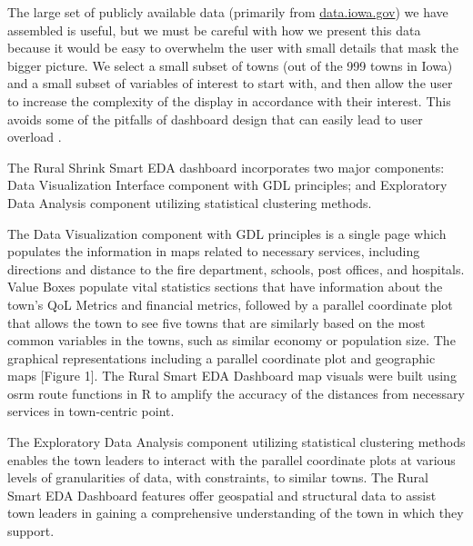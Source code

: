 \documentclass[10pt]{article}\usepackage[]{graphicx}\usepackage[]{color}
\begin{document}
The large set of publicly available data (primarily from \url{data.iowa.gov}) we have assembled is useful, but we must be careful with how we present this data because it would be easy to overwhelm the user with small details that mask the bigger picture. We select a small subset of towns (out of the 999 towns in Iowa) and a small subset of variables of interest to start with, and then allow the user to increase the complexity of the display in accordance with their interest. This avoids some of the pitfalls of dashboard design that can easily lead to user overload \cite{few}.


The Rural Shrink Smart EDA dashboard incorporates two major components: Data Visualization Interface component with GDL principles; and Exploratory Data Analysis component utilizing statistical clustering methods.

The Data Visualization component with GDL principles is a single page which populates the information in maps related to necessary services, including directions and distance to the fire department, schools, post offices, and hospitals. Value Boxes populate vital statistics sections that have information about the town's QoL Metrics and financial metrics, followed by a parallel coordinate plot that allows the town to see five towns that are similarly based on the most common variables in the towns, such as similar economy or population size. The graphical representations including a parallel coordinate plot and geographic maps [Figure 1]. The Rural Smart EDA Dashboard map visuals were built using osrm route functions in R to amplify the accuracy of the distances from necessary services in town-centric point.

The Exploratory Data Analysis component utilizing statistical clustering methods enables the town leaders to interact with the parallel coordinate plots at various levels of granularities of data, with constraints, to similar towns. The Rural Smart EDA Dashboard features offer geospatial and structural data to assist town leaders in gaining a comprehensive understanding of the town in which they support. 
\end{document}
